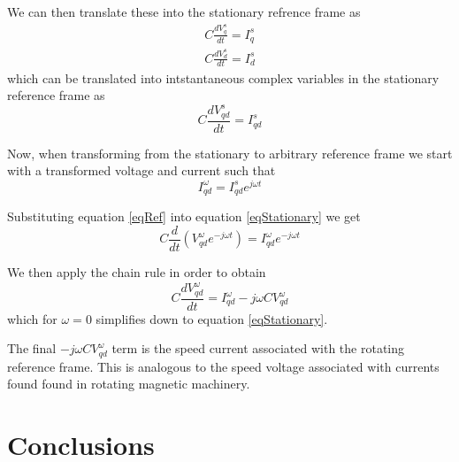 \documentclass[10pt,letterpaper]{IEEEtran}
\begin{document}
We can then translate these into the stationary refrence frame as
\begin{align}
C \frac{d V_q^s}{dt} = I_q^s \\
C \frac{d V_d^s}{dt} = I_d^s
\end{align}
which can be translated into intstantaneous complex variables in the
stationary reference frame as
\begin{equation}
\label{eqStationary}
C \frac{d V_{qd}^s}{dt} = I_{qd}^s
\end{equation}

Now, when transforming from the stationary to arbitrary reference frame we
start with a transformed voltage and current such that
\begin{equation}
\label{eqRef}
I_{qd}^\omega = I_{qd}^s e^{j\omega t}
\end{equation}

Substituting equation \ref{eqRef} into equation \ref{eqStationary} we get
\begin{equation}
C \frac{d}{dt} \left({V_{qd}^\omega e^{-j\omega t}}\right) = I_{qd}^\omega
e^{-j\omega t}
\end{equation}

We then apply the chain rule in order to obtain
\begin{equation}
C \frac{d V_{qd}^\omega}{dt} = I_{qd}^\omega  - j
\omega C V_{qd}^\omega
\end{equation}
which for $\omega = 0$ simplifies down to equation \ref{eqStationary}.

The final $- j \omega C V_{qd}^\omega$ term is the speed current
associated with the rotating reference frame.
This is analogous to the speed voltage associated with currents found found in
rotating magnetic machinery.


\section{Conclusions}



\end{document}
